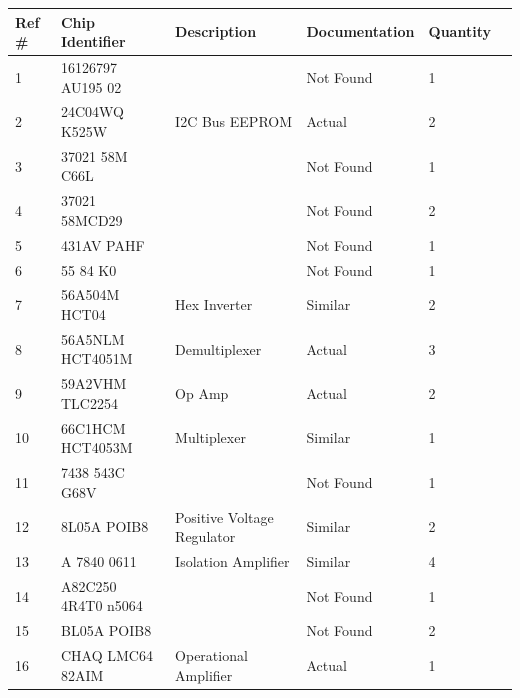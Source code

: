 \documentclass[]{formalLabReport}
\begin{document}
\begin{center}
    \begin{table}[]
        \begin{tabular}{|l|l|l|l|l|l|}
        \hline
        Ref \#& Chip Identifier     & Description                & Documentation & Quantity \\ \hline
        1     & 16126797 AU195 02   &                            & Not Found     & 1        \\ \hline
        2     & 24C04WQ K525W       & I2C Bus EEPROM             & Actual        & 2        \\ \hline
        3     & 37021 58M C66L      &                            & Not Found     & 1        \\ \hline
        4     & 37021 58MCD29       &                            & Not Found     & 2        \\ \hline
        5     & 431AV PAHF          &                            & Not Found     & 1        \\ \hline
        6     & 55 84 K0            &                            & Not Found     & 1        \\ \hline
        7     & 56A504M HCT04       & Hex Inverter               & Similar       & 2        \\ \hline
        8     & 56A5NLM HCT4051M    & Demultiplexer              & Actual        & 3        \\ \hline
        9     & 59A2VHM TLC2254     & Op Amp                     & Actual        & 2        \\ \hline
        10    & 66C1HCM HCT4053M    & Multiplexer                & Similar       & 1        \\ \hline
        11    & 7438 543C G68V      &                            & Not Found     & 1        \\ \hline
        12    & 8L05A POIB8         & Positive Voltage Regulator & Similar       & 2        \\ \hline
        13    & A 7840 0611         & Isolation Amplifier        & Similar       & 4        \\ \hline
        14    & A82C250 4R4T0 n5064 &                            & Not Found     & 1        \\ \hline
        15    & BL05A POIB8         &                            & Not Found     & 2        \\ \hline
        16    & CHAQ LMC64 82AIM    & Operational Amplifier      & Actual        & 1        \\ \hline

\end{tabular}
\end{table}
\end{center}
\end{document}
